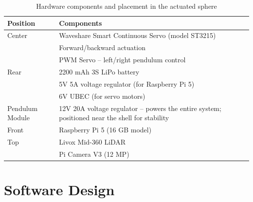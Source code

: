 \documentclass[english, bachelor, utf8]{base/thesis_telematics}
\begin{document}
\begin{table}
\centering
\caption{Hardware components and placement in the actuated sphere}
\label{tab:hardware_components_actuated}
\begin{tabularx}{\linewidth}{@{}l X@{}}
\toprule
\textbf{Position} & \textbf{Components} \\
\midrule
Center & Waveshare Smart Continuous Servo (model ST3215) \\
       & Forward/backward actuation \\
       & PWM Servo – left/right pendulum control \\
Rear   & 2200 mAh 3S LiPo battery \\
       & 5V 5A voltage regulator (for Raspberry Pi 5) \\
       & 6V UBEC (for servo motors) \\
Pendulum Module & 12V 20A voltage regulator – powers the entire system; positioned near the shell for stability \\
Front  & Raspberry Pi 5 (16 GB model) \\
Top    & Livox Mid-360 LiDAR \\
       & Pi Camera V3 (12 MP) \\
\bottomrule
\end{tabularx}
\vspace{-4mm}
\end{table}



\chapter{Software Design}
\end{document}
